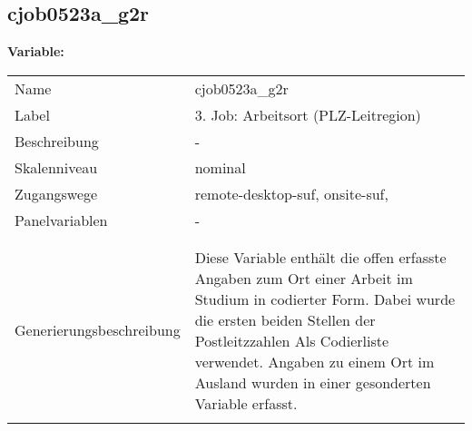 	
	
	\subsection{cjob0523a\_g2r}
	\label{subSection:cjob0523a_g2r}

	\noindent\textbf{Variable:}\\
		\begin{tabular}{lL{11.3cm}}
			\label{tableVariable:cjob0523a_g2r}
			Name & cjob0523a\_g2r \\
			Label & 3. Job: Arbeitsort (PLZ-Leitregion) \\
			Beschreibung & - \\
			Skalenniveau & nominal \\
			Zugangswege &
				remote-desktop-suf,
				onsite-suf,
 \\
			Panelvariablen & -
			 \\
			 \\
 \\
					Generierungsbeschreibung & Diese Variable enthält die offen erfasste Angaben zum Ort einer Arbeit im Studium in codierter Form. Dabei wurde die ersten beiden Stellen der Postleitzzahlen Als Codierliste verwendet. Angaben zu einem Ort im Ausland wurden in einer gesonderten Variable erfasst.
				 \\	
			 \\
		\end{tabular}






